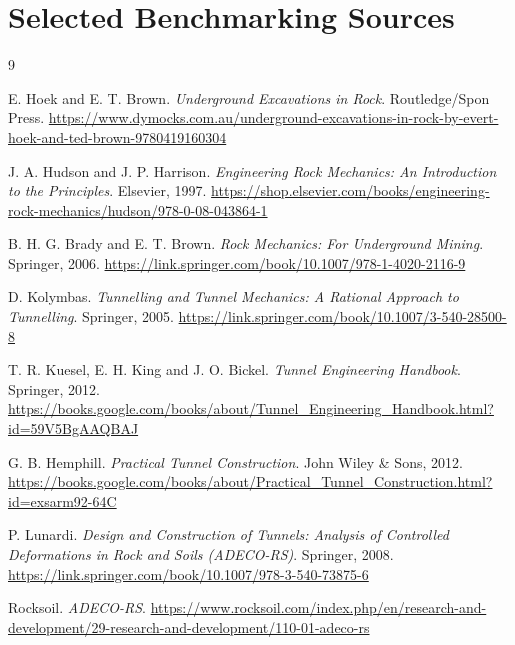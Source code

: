 \documentclass[12pt,oneside]{book}
\begin{document}
\chapter{Selected Benchmarking Sources}
\begin{thebibliography}{9}

E. Hoek and E. T. Brown.
\textit{Underground Excavations in Rock}.
Routledge/Spon Press.
\url{https://www.dymocks.com.au/underground-excavations-in-rock-by-evert-hoek-and-ted-brown-9780419160304}

J. A. Hudson and J. P. Harrison.
\textit{Engineering Rock Mechanics: An Introduction to the Principles}.
Elsevier, 1997.
\url{https://shop.elsevier.com/books/engineering-rock-mechanics/hudson/978-0-08-043864-1}

B. H. G. Brady and E. T. Brown.
\textit{Rock Mechanics: For Underground Mining}.
Springer, 2006.
\url{https://link.springer.com/book/10.1007/978-1-4020-2116-9}

D. Kolymbas.
\textit{Tunnelling and Tunnel Mechanics: A Rational Approach to Tunnelling}.
Springer, 2005.
\url{https://link.springer.com/book/10.1007/3-540-28500-8}

T. R. Kuesel, E. H. King and J. O. Bickel.
\textit{Tunnel Engineering Handbook}.
Springer, 2012.
\url{https://books.google.com/books/about/Tunnel_Engineering_Handbook.html?id=59V5BgAAQBAJ}

G. B. Hemphill.
\textit{Practical Tunnel Construction}.
John Wiley \& Sons, 2012.
\url{https://books.google.com/books/about/Practical_Tunnel_Construction.html?id=exsarm92-64C}

P. Lunardi.
\textit{Design and Construction of Tunnels: Analysis of Controlled Deformations in Rock and Soils (ADECO-RS)}.
Springer, 2008.
\url{https://link.springer.com/book/10.1007/978-3-540-73875-6}

Rocksoil.
\textit{ADECO-RS}.
\url{https://www.rocksoil.com/index.php/en/research-and-development/29-research-and-development/110-01-adeco-rs}

\end{thebibliography}
\end{document}
